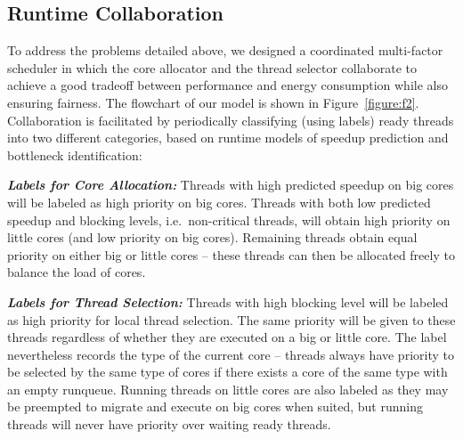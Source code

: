\subsection{Runtime Collaboration}
To address the problems detailed above, we designed a coordinated multi-factor scheduler in which the core allocator and the thread selector collaborate to achieve a good tradeoff between performance and energy consumption while also ensuring fairness.
The flowchart of our model is shown in Figure~\ref{figure:f2}. 
Collaboration is facilitated by periodically classifying (using labels) ready threads into two different categories, based on runtime models of speedup prediction and bottleneck identification: 

\textbf{\textit{Labels for Core Allocation:}}
Threads with high predicted speedup on big cores will be labeled as high priority on big cores. Threads with both low predicted speedup and blocking levels, i.e.~non-critical threads, will obtain high priority on little cores (and low priority on big cores). Remaining threads obtain equal priority on either big or little cores -- these threads can then be allocated freely to balance the load of cores.

\textbf{\textit{Labels for Thread Selection:}}
Threads with high blocking level will be labeled as high priority for local thread selection. The same priority will be given to these threads regardless of whether they are executed on a big or little core. The label nevertheless records the type of the current core -- threads always have priority to be selected by the same type of cores if there exists a core of the same type with an empty runqueue. Running threads on little cores are also labeled as they may be preempted to migrate and execute on big cores when suited, but running threads will never have priority over waiting ready threads. 



